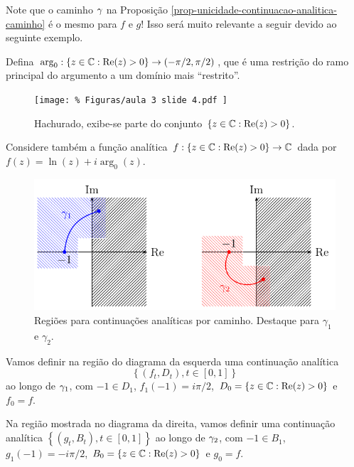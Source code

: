     \begin{observacao}
        Note que o caminho $\gamma$ na 
        Proposição \ref{prop-unicidade-continuacao-analitica-caminho} é o
        mesmo para $f$ e $g$! Isso será muito relevante a seguir devido ao 
        seguinte exemplo.
        
        Defina $\arg_0: \left\{ z\in\mathbb{C} : \mathrm{Re}(z) > 0 \right\} \to (-\pi/2, \pi/2)$,
        que é uma restrição do ramo principal do argumento a um domínio mais ``restrito''.
        \begin{figure}[H]\centering
            \texttt{[image: \%
                Figuras/aula 3 slide 4.pdf
            ]}
            \caption{%
                Hachurado, exibe-se parte do conjunto 
                $\{z\in\mathbb{C}: \mathrm{Re}(z)>0\}$.
            }
        \end{figure}
        Considere também a função analítica 
        $f: \left\{ z\in\mathbb{C} : \mathrm{Re}(z) > 0 \right\} \to\mathbb{C}$
        dada por $f(z) = \ln(z) + i\arg_0(z)$.
        \begin{figure}[H]\centering
            \includegraphics{
                Figuras/aula 3 slide 5.pdf
            }
            \caption{
                Regiões para continuações analíticas por caminho. 
                Destaque para $\gamma_1$ e $\gamma_2$.
            }
        \end{figure}
        Vamos definir na região do diagrama da esquerda uma continuação analítica
        \begin{equation*}
            \left\{ (f_t, D_t), t\in [0,1] \right\}
        \end{equation*}
        ao longo de $\gamma_1$, com $-1\in D_1$, $f_1(-1) = i\pi/2$,
        $D_0 = \left\{ z\in\mathbb{C} : \mathrm{Re}(z) > 0 \right\}$ e $f_0 = f$.
        
        Na região mostrada no diagrama da direita, vamos definir uma continuação analítica
        $\left\{ (g_t, B_t), t\in [0,1] \right\}$ ao longo de $\gamma_2$,
        com $-1\in B_1$, $g_1(-1) = -i\pi/2$, 
        $B_0 = \left\{ z\in\mathbb{C} : \mathrm{Re}(z) > 0 \right\}$ e $g_0 = f$.
        

\end{observacao}
